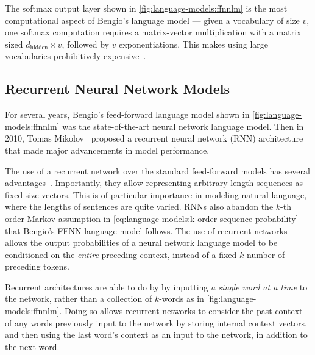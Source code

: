 The softmax output layer shown in \autoref{fig:language-models:ffnnlm} is the most computational aspect of Bengio's language model ---
given a vocabulary of size $v$, one softmax computation requires a matrix-vector multiplication with a matrix sized $d_\text{hidden} \times v$, followed by $v$ exponentiations.
This makes using large vocabularies prohibitively expensive~\cite{goldberg_2017}.

\subsection{Recurrent Neural Network Models}\label{sec:language-models:rnns}

For several years, Bengio's feed-forward language model shown in \autoref{fig:language-models:ffnnlm} was the state-of-the-art neural network language model.
Then in 2010, Tomas Mikolov~\cite{Mikolov2010RecurrentNN,Mikolov2011RecurrentNN,Mikolov2012ContextDR} proposed a recurrent neural network (RNN) architecture that made major advancements in model performance.

The use of a recurrent network over the standard feed-forward models has several advantages~\cite{goldberg_2017}.
Importantly, they allow representing arbitrary-length sequences as fixed-size vectors.
This is of particular importance in modeling natural language, where the lengths of sentences are quite varied.
RNNs also abandon the $k$-th order Markov assumption in \autoref{eq:language-models:k-order-sequence-probability} that Bengio's FFNN language model follows.
The use of recurrent networks allows the output probabilities of a neural network language model to be conditioned on the \textit{entire} preceding context, instead of a fixed $k$ number of preceding tokens.

Recurrent architectures are able to do by by inputting \textit{a single word at a time} to the network, rather than a collection of $k$-words as in \autoref{fig:language-models:ffnnlm}.
Doing so allows recurrent networks to consider the past context of any words previously input to the network by storing internal context vectors, and then using the last word's context as an input to the network, in addition to the next word.

